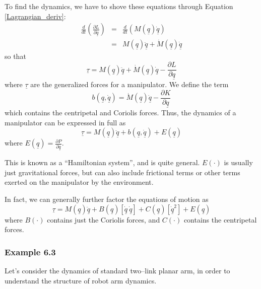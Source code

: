 \documentclass[fleqn]{article}
\begin{document}
To find the dynamics, we have to shove these equations through Equation \ref{Lagrangian_deriv}:
\begin{eqnarray}
	\frac{d}{dt}\left(\frac{\partial L}{\partial \underline{\dot{q}}}\right) & = & \frac{d}{dt} \left( M(\underline{q}) \underline{\dot{q}} \right)  \nonumber \\
	& = & M(\underline{q})\underline{\ddot{q}} + \dot{M}(\underline{q}) \dot{\underline{q}} \nonumber
\end{eqnarray}
so that
\begin{equation}
	\underline{\tau} = M(\underline{q})\underline{\ddot{q}} + \dot{M}(\underline{q})\underline{\dot{q}} - \frac{\partial L}{\partial \underline{q}}
\end{equation}
where $\underline{\tau}$ are the generalized forces for a manipulator.
We define the term
\begin{displaymath}
b(\underline{q}, \underline{\dot{q}}) = \dot{M}(\underline{q})\dot{\underline{q}} - \frac{\partial K}{\partial \underline{q}}
\end{displaymath}
which contains the centripetal and Coriolis forces. Thus, the dynamics of a manipulator can be expressed in full as 
\begin{equation}
	\underline{\tau} = M(\underline{q})\underline{\ddot{q}} + b(\underline{q}, \underline{\dot{q}}) + E(\underline{q})
\end{equation}
where $E(\underline{q}) = \frac{\partial P}{\partial\underline{q}}$.

This is known as a ``Hamiltonian system'', and is quite general. $E(\cdot)$ is usually just gravitational forces, but can also include frictional terms or other terms exerted on the manipulator by the environment.

In fact, we can generally further factor the equations of motion as
\begin{equation}
	\underline{\tau} = M(\underline{q})\underline{\ddot{q}} + B(\underline{q})\left[\underline{\dot{q}}\ \underline{\dot{q}}\right] + C(\underline{q})\left[\underline{\dot{q}}^{2}\right] + E(\underline{q})
\end{equation}
where $B(\cdot)$ contains just the Coriolis forces, and $C(\cdot)$ contains the centripetal forces.

\subsubsection{Example 6.3}
Let's consider the dynamics of standard two--link planar arm, in order to understand the structure of robot arm dynamics.
\end{document}
